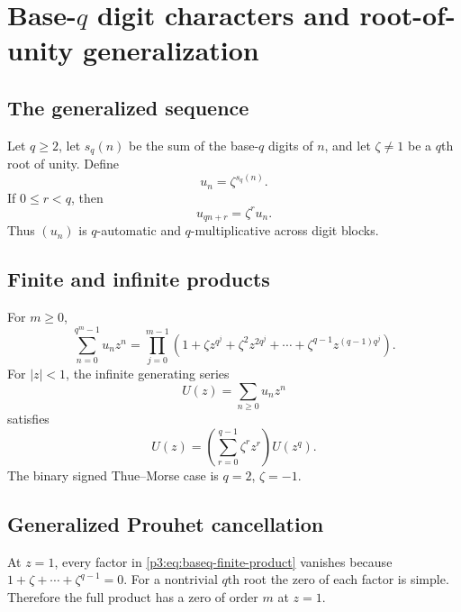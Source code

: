 \documentclass[11pt,oneside]{article}
\theoremstyle{definition}
\theoremstyle{remark}
\begin{document}
\section{\texorpdfstring{Base-$q$}{Base-q} digit characters and root-of-unity generalization}

\subsection{The generalized sequence}

Let $q\ge2$, let $s_q(n)$ be the sum of the base-$q$ digits of $n$, and let
$\zeta\ne1$ be a $q$th root of unity.  Define
\begin{equation}\label{p3:eq:baseq-character}
 u_n=\zeta^{s_q(n)}.
\end{equation}
If $0\le r<q$, then
\begin{equation}\label{p3:eq:baseq-recursion}
 u_{qn+r}=\zeta^r u_n.
\end{equation}
Thus $(u_n)$ is $q$-automatic and $q$-multiplicative across digit blocks.

\subsection{Finite and infinite products}

For $m\ge0$,
\begin{equation}\label{p3:eq:baseq-finite-product}
 \sum_{n=0}^{q^m-1}u_nz^n
 =\prod_{j=0}^{m-1}
  \left(1+\zeta z^{q^j}+\zeta^2z^{2q^j}
  +\cdots+\zeta^{q-1}z^{(q-1)q^j}\right).
\end{equation}
For $|z|<1$, the infinite generating series
\begin{equation}\label{p3:eq:baseq-infinite}
 U(z)=\sum_{n\ge0}u_nz^n
\end{equation}
satisfies
\begin{equation}\label{p3:eq:baseq-mahler}
 U(z)=\left(\sum_{r=0}^{q-1}\zeta^rz^r\right)U(z^q).
\end{equation}
The binary signed Thue--Morse case is $q=2$, $\zeta=-1$.

\subsection{Generalized Prouhet cancellation}

At $z=1$, every factor in \cref{p3:eq:baseq-finite-product} vanishes because
$1+\zeta+\cdots+\zeta^{q-1}=0$.  For a nontrivial $q$th root the zero of each
factor is simple.  Therefore the full product has a zero of order $m$ at
$z=1$.
\end{document}
